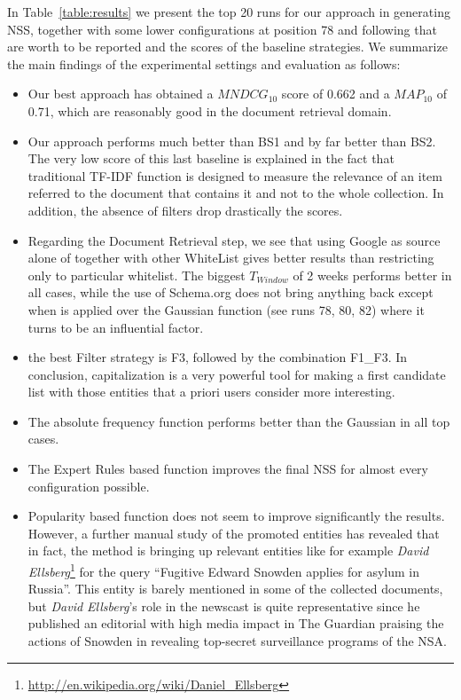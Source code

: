 \documentclass{llncs}
\begin{document}
In Table~\ref{table:results} we present the top 20 runs for our approach in generating NSS, together with some lower configurations at position 78 and following that are worth to be reported and the scores of the baseline strategies. We summarize the main findings of the experimental settings and evaluation as follows:
\begin{itemize}
\item Our best approach has obtained a $MNDCG_{10}$ score of 0.662 and a $MAP_{10}$ of 0.71, which are reasonably good in the document retrieval domain.
\item Our approach performs much better than BS1 and by far better than BS2. The very low score of this last baseline is explained in the fact that traditional TF-IDF function is designed to measure the relevance of an item referred to the document that contains it and not to the whole collection. In addition, the absence of filters drop drastically the scores.
\item Regarding the Document Retrieval step, we see that using Google as source alone of together with other WhiteList gives better results than restricting only to particular whitelist. The biggest $T_{Window}$ of 2 weeks performs better in all cases, while the use of Schema.org does not bring anything back except when is applied over the Gaussian function (see runs 78, 80, 82) where it turns to be an influential factor.
\item the best Filter strategy is F3, followed by the combination F1\_F3. In conclusion, capitalization is a very powerful tool for making a first candidate list with those entities that a priori users consider more interesting.
\item The absolute frequency function performs better than the Gaussian in all top cases.
\item The Expert Rules based function improves the final NSS for almost every configuration possible.
\item Popularity based function does not seem to improve significantly the results. However, a further manual study of the promoted entities has revealed that in fact, the method is bringing up relevant entities like for example \textit{David Ellsberg}\footnote{\url{http://en.wikipedia.org/wiki/Daniel_Ellsberg}} for the query ``Fugitive Edward Snowden applies for asylum in Russia''. This entity is barely mentioned in some of the collected documents, but \textit{David Ellsberg}'s role in the newscast is quite representative since he published an editorial with high media impact in The Guardian praising the actions of Snowden in revealing top-secret surveillance programs of the NSA. 
\end{itemize}
\end{document}
